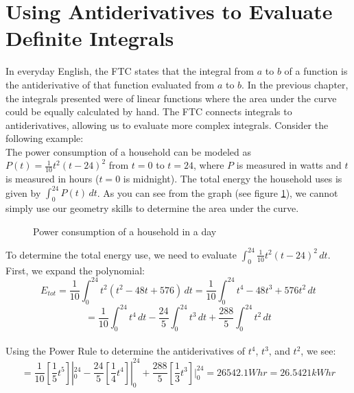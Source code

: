 \section{Using Antiderivatives to Evaluate Definite Integrals}
In everyday English, the FTC states that the integral from $a$ to $b$ 
of a function is the antiderivative of that function evaluated from 
$a$ to $b$. In the previous chapter, the integrals presented were of 
linear functions where the area under the curve could be equally 
calculated by hand. The FTC connects integrals to antiderivatives, 
allowing us to evaluate more complex integrals. Consider the following 
example:\\

The power consumption of a household can be modeled as 
$P(t) = \frac{1}{10} t^2 (t - 24)^2$ from $t = 0$ to $t = 24$, where 
$P$ is measured in watts and $t$ is measured in hours ($t = 0$ is 
midnight). The total energy the household uses is given by $\int_{0}^{24} 
P(t)\,dt$. As you can see from the graph (see figure \ref{fig:power}), 
we cannot simply use our geometry skills to determine the area under 
the curve. 

\begin{figure}
	\caption{Power consumption of a household in a day}
	\label{fig:power}
\end{figure}

To determine the total energy use, we need to evaluate $\int_{0}^{24} 
\frac{1}{10}t^2(t-24)^2\,dt$. First, we expand the polynomial:\\
$$E_{tot} = \frac{1}{10} \int_{0}^{24} t^2 (t^2-48t+576)\,dt = 
\frac{1}{10}\int_{0}^{24} t^4 - 48t^3 + 576t^2\,dt$$
$$= \frac{1}{10}\int_{0}^{24} t^4\,dt - \frac{24}{5}\int_{0}^{24} 
t^3\,dt + \frac{288}{5}\int_{0}^{24} t^2\,dt$$\\
Using the Power Rule to determine the antiderivatives of $t^4$, $t^3$, 
and $t^2$, we see:\\
$$=\frac{1}{10}[\frac{1}{5}t^5]|_{0}^{24} - \frac{24}{5}
[\frac{1}{4}t^4]|_{0}^{24} + \frac{288}{5}[\frac{1}{3}t^3]|_{0}^{24} 
= 26542.1 Whr = 26.5421 kWhr$$

